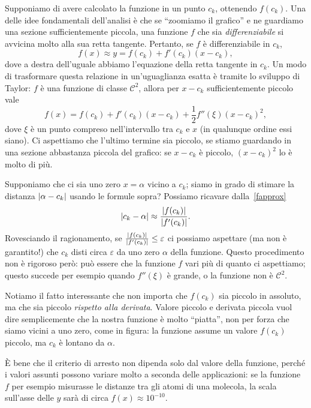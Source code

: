 \documentclass[a4paper]{report}
\DeclarePairedDelimiter{\abs}{\lvert}{\rvert}
\theoremstyle{definition}
\theoremstyle{remark}
\newcommand{\x}{\mathbf{x}}
\begin{document}
Supponiamo di avere calcolato la funzione in un punto $c_k$, ottenendo $f(c_k)$. Una delle idee fondamentali dell'analisi è che se ``zoomiamo il grafico'' e ne guardiamo una sezione sufficientemente piccola, una funzione $f$ che sia \emph{differenziabile} si avvicina molto alla sua retta tangente. Pertanto, se $f$ è differenziabile in $c_k$,
\begin{equation} \label{fapprox}
    f(x) \approx y = f(c_k) + f'(c_k)(x-c_k),
\end{equation}
dove a destra dell'uguale abbiamo l'equazione della retta tangente in $c_k$. Un modo di trasformare questa relazione in un'uguaglianza esatta è tramite lo sviluppo di Taylor: $f$ è una funzione di classe $\mathcal{C}^2$, allora per $x-c_k$ sufficientemente piccolo vale
\[
    f(x) = f(c_k) + f'(c_k)(x-c_k) + \frac{1}{2}f''(\xi) (x-c_k)^2,
\]
dove $\xi$ è un punto compreso nell'intervallo tra $c_k$ e $x$ (in qualunque ordine essi siano). Ci aspettiamo che l'ultimo termine sia piccolo, se stiamo guardando in una sezione abbastanza piccola del grafico: se $x-c_k$ è piccolo, $(x-c_k)^2$ lo è molto di più.

Supponiamo che ci sia uno zero $x = \alpha$ vicino a $c_k$; siamo in grado di stimare la distanza $\abs{\alpha - c_k}$ usando le formule sopra? Possiamo ricavare dalla~\eqref{fapprox}
\[
\abs{c_k-\alpha} \approx \frac{\abs{f(c_k)}}{\abs{f'(c_k)}}.
\]
Rovesciando il ragionamento, se $\frac{\abs{f(c_k)}}{\abs{f'(c_k)}} \leq \varepsilon$ ci possiamo aspettare (ma non è garantito!) che $c_k$ disti circa $\varepsilon$ da uno zero $\alpha$ della funzione. Questo procedimento non è rigoroso però: può essere che la funzione $f$ vari più di quanto ci aspettiamo; questo succede per esempio quando $f''(\xi)$ è grande, o la funzione non è $\mathcal{C}^2$.

Notiamo il fatto interessante che non importa che $f(c_k)$ sia piccolo in assoluto, ma che sia piccolo \emph{rispetto alla derivata}. Valore piccolo e derivata piccola vuol dire semplicemente che la nostra funzione è molto ``piatta'', non per forza che siamo vicini a uno zero, come in figura: la funzione assume un valore $f(c_k)$ piccolo, ma $c_k$ è lontano da $\alpha$.
\begin{center}
\end{center}
È bene che il criterio di arresto non dipenda solo dal valore della funzione, perché i valori assunti possono variare molto a seconda delle applicazioni: se la funzione $f$ per esempio misurasse le distanze tra gli atomi di una molecola, la scala sull'asse delle $y$ sarà di circa $f(x) \approx 10^{-10}$.
\end{document}
